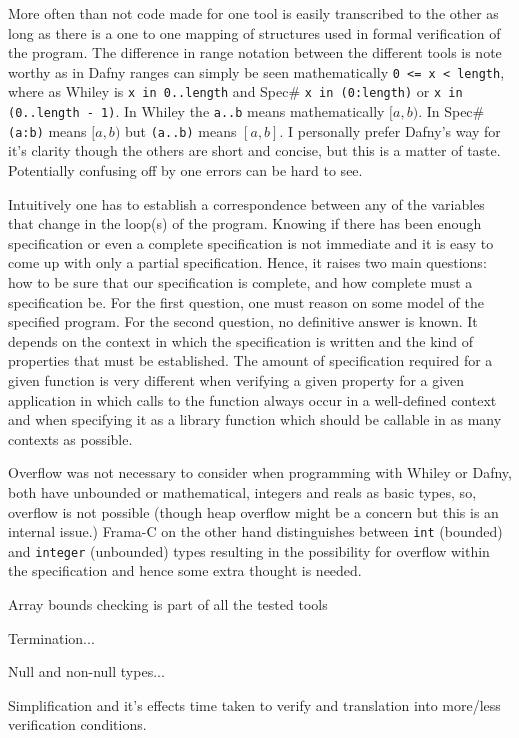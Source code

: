 \documentclass[10pt]{article} %
\begin{document}
More often than not code made for one tool is easily transcribed to the other as long as there is a one to one mapping of structures used in formal verification of the program. The difference in range notation between the different tools is note worthy as in Dafny ranges can simply be seen mathematically \verb/0 <= x < length/, where as Whiley is \verb/x in 0..length/ and Spec\# \verb/x in (0:length)/ or \verb/x in (0..length - 1)/. In Whiley the \verb/a..b/ means mathematically $[a,b)$. In Spec\# \verb/(a:b)/ means  $[a,b)$ but \verb/(a..b)/ means $[a,b]$. I personally prefer Dafny's way for it's clarity though the others are short and concise, but this is a matter of taste. Potentially confusing off by one errors can be hard to see.

Intuitively one has to establish a correspondence between any of the variables that change in the loop(s) of the program. Knowing if there has been enough specification or even a complete specification is not immediate and it is easy to come up with only a partial specification. Hence, it raises two main questions: how to be sure that our specification is complete, and how complete must a specification be. For the first question, one must reason on some model of the specified program. For the second question, no definitive answer is known. It depends on the context in which the specification is written and the kind of properties that must be established. The amount of specification required for a given function is very different when verifying a given property for a given application in which calls to the function always occur in a well-defined context and when specifying it as a library function which should be callable in as many contexts as possible.

Overflow was not necessary to consider when programming with Whiley or Dafny, both have unbounded or mathematical, integers and reals as basic types, so, overflow is not possible (though heap overflow might be a concern but this is an internal issue.) Frama-C on the other hand distinguishes between \verb/int/ (bounded) and \verb/integer/ (unbounded) types resulting in the possibility for overflow within the specification and hence some extra thought is needed.

Array bounds checking is part of all the tested tools 

Termination...

Null and non-null types...

Simplification and it's effects time taken to verify and translation into more/less verification conditions.
\end{document}
